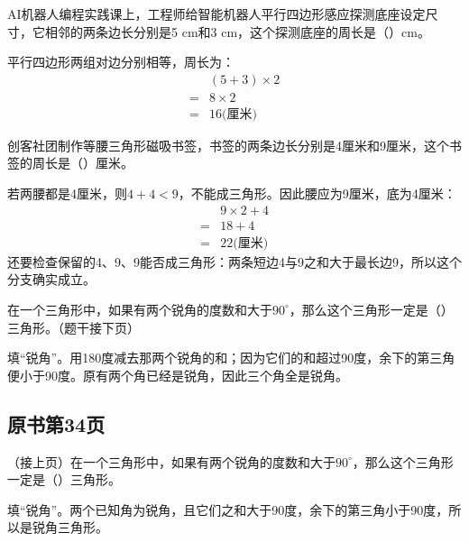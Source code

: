 AI机器人编程实践课上，工程师给智能机器人平行四边形感应探测底座设定尺寸，它相邻的两条边长分别是5 cm和3 cm，这个探测底座的周长是（\hspace{1.8em}）cm。\par
\begin{BookAnswer}
平行四边形两组对边分别相等，周长为：\[\begin{aligned} &(5+3)\times2\\={}&8\times2\\={}&16\text{(厘米)}\end{aligned}\]
\end{BookAnswer}

创客社团制作等腰三角形磁吸书签，书签的两条边长分别是4厘米和9厘米，这个书签的周长是（\hspace{1.8em}）厘米。\par
\begin{BookAnswer}
若两腰都是4厘米，则\(4+4<9\)，不能成三角形。因此腰应为9厘米，底为4厘米：\[\begin{aligned} &9\times2+4\\={}&18+4\\={}&22\text{(厘米)}\end{aligned}\]还要检查保留的4、9、9能否成三角形：两条短边4与9之和大于最长边9，所以这个分支确实成立。
\end{BookAnswer}

在一个三角形中，如果有两个锐角的度数和大于\(90^\circ\)，那么这个三角形一定是（\hspace{1.8em}）三角形。（题干接下页）\par
\begin{BookAnswer}
填“锐角”。用180度减去那两个锐角的和；因为它们的和超过90度，余下的第三角便小于90度。原有两个角已经是锐角，因此三个角全是锐角。
\end{BookAnswer}



\subsection*{原书第34页}

（接上页）在一个三角形中，如果有两个锐角的度数和大于\(90^\circ\)，那么这个三角形一定是（\hspace{1.8em}）三角形。\par
\begin{BookAnswer}
填“锐角”。两个已知角为锐角，且它们之和大于90度，余下的第三角小于90度，所以是锐角三角形。
\end{BookAnswer}

